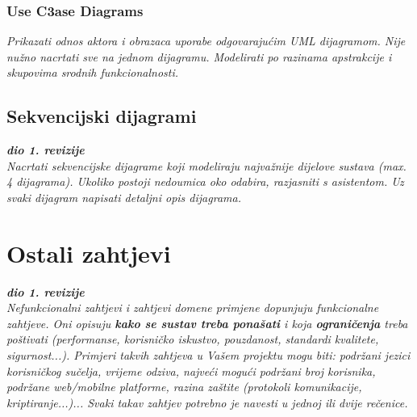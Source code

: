 			\subsubsection{Use C3ase Diagrams}
					
					\textit{Prikazati odnos aktora i obrazaca uporabe odgovarajućim UML dijagramom. Nije nužno nacrtati sve na jednom dijagramu. Modelirati po razinama apstrakcije i skupovima srodnih funkcionalnosti.}
				\eject		
				
			\subsection{Sekvencijski dijagrami}
				
				\textbf{\textit{dio 1. revizije}}\\
				
				\textit{Nacrtati sekvencijske dijagrame koji modeliraju najvažnije dijelove sustava (max. 4 dijagrama). Ukoliko postoji nedoumica oko odabira, razjasniti s asistentom. Uz svaki dijagram napisati detaljni opis dijagrama.}
				\eject
	
		\section{Ostali zahtjevi}
		
			\textbf{\textit{dio 1. revizije}}\\
		 
			 \textit{Nefunkcionalni zahtjevi i zahtjevi domene primjene dopunjuju funkcionalne zahtjeve. Oni opisuju \textbf{kako se sustav treba ponašati} i koja \textbf{ograničenja} treba poštivati (performanse, korisničko iskustvo, pouzdanost, standardi kvalitete, sigurnost...). Primjeri takvih zahtjeva u Vašem projektu mogu biti: podržani jezici korisničkog sučelja, vrijeme odziva, najveći mogući podržani broj korisnika, podržane web/mobilne platforme, razina zaštite (protokoli komunikacije, kriptiranje...)... Svaki takav zahtjev potrebno je navesti u jednoj ili dvije rečenice.}
			 
			 
			 
	